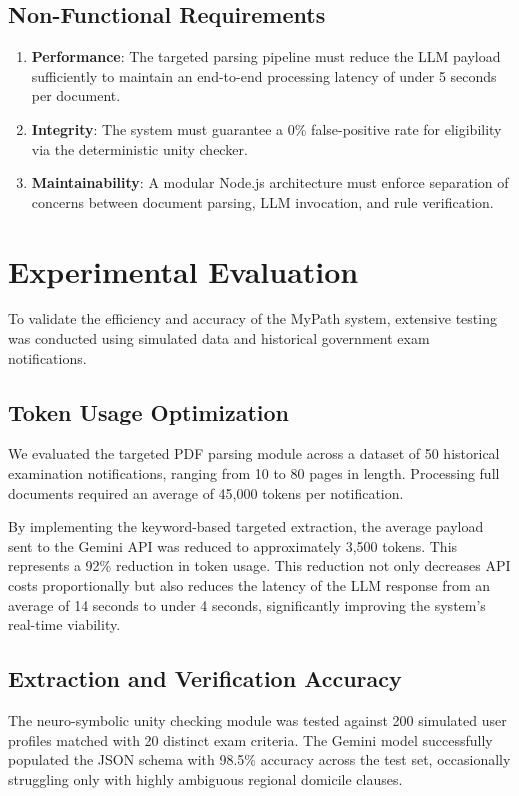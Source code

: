 \documentclass[conference]{IEEEtran}
\begin{document}
\subsection{Non-Functional Requirements}
\begin{enumerate}
    \item \textbf{Performance}: The targeted parsing pipeline must reduce the LLM payload sufficiently to maintain an end-to-end processing latency of under 5 seconds per document.
    \item \textbf{Integrity}: The system must guarantee a 0\% false-positive rate for eligibility via the deterministic unity checker.
    \item \textbf{Maintainability}: A modular Node.js architecture must enforce separation of concerns between document parsing, LLM invocation, and rule verification.
\end{enumerate}

\section{Experimental Evaluation}

To validate the efficiency and accuracy of the MyPath system, extensive testing was conducted using simulated data and historical government exam notifications.

\subsection{Token Usage Optimization}
We evaluated the targeted PDF parsing module across a dataset of 50 historical examination notifications, ranging from 10 to 80 pages in length. Processing full documents required an average of 45,000 tokens per notification. 

By implementing the keyword-based targeted extraction, the average payload sent to the Gemini API was reduced to approximately 3,500 tokens. This represents a 92\% reduction in token usage. This reduction not only decreases API costs proportionally but also reduces the latency of the LLM response from an average of 14 seconds to under 4 seconds, significantly improving the system's real-time viability.

\subsection{Extraction and Verification Accuracy}
The neuro-symbolic unity checking module was tested against 200 simulated user profiles matched with 20 distinct exam criteria. The Gemini model successfully populated the JSON schema with 98.5\% accuracy across the test set, occasionally struggling only with highly ambiguous regional domicile clauses. 
\end{document}
